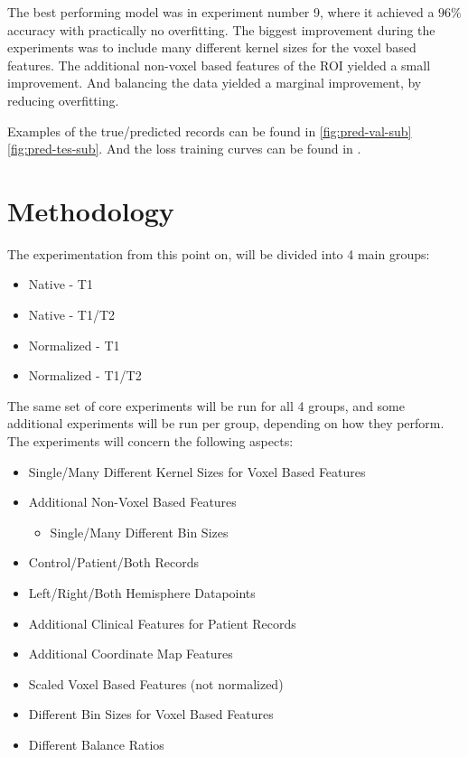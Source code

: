 The best performing model was in experiment number 9, where it achieved a $96\%$ accuracy with practically no overfitting. The biggest improvement during the experiments was to include many different kernel sizes for the voxel based features. The additional non-voxel based features of the ROI yielded a small improvement. And balancing the data yielded a marginal improvement, by reducing overfitting.\par
Examples of the true/predicted records can be found in  \ref{fig:pred-val-sub} \ref{fig:pred-tes-sub}. And the loss training curves can be found in .

\section{Methodology}

The experimentation from this point on, will be divided into 4 main groups:
\begin{itemize}
  \item Native - T1
  \item Native - T1/T2
  \item Normalized - T1
  \item Normalized - T1/T2
\end{itemize}
The same set of core experiments will be run for all 4 groups, and some additional experiments will be run per group, depending on how they perform. The experiments will concern the following aspects:
\begin{itemize}
  \item Single/Many Different Kernel Sizes for Voxel Based Features
  \item Additional Non-Voxel Based Features
  \begin{itemize}
    \item Single/Many Different Bin Sizes
  \end{itemize}
  \item Control/Patient/Both Records
  \item Left/Right/Both Hemisphere Datapoints
  \item Additional Clinical Features for Patient Records
  \item Additional Coordinate Map Features
  \item Scaled Voxel Based Features (not normalized)
  \item Different Bin Sizes for Voxel Based Features
  \item Different Balance Ratios
\end{itemize}

